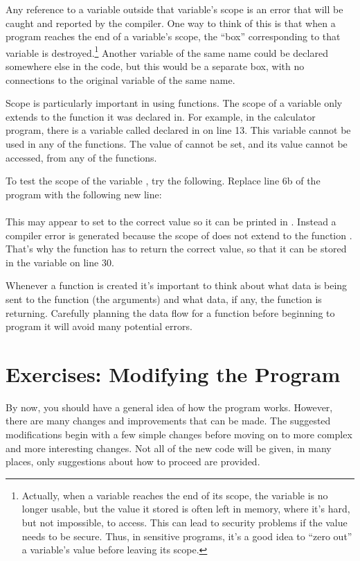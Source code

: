 Any reference to a variable outside that variable's scope is an error that will be caught and reported by the compiler.  One way to think of this is that when a program reaches the end of a variable's scope, the ``box'' corresponding to that variable is destroyed.\footnote{Actually, when a variable reaches the end of its scope, the variable is no longer usable, but the value it stored is often left in memory, where it's hard, but not impossible, to access.  This can lead to security problems if the value needs to be secure.  Thus, in sensitive programs, it's a good idea to ``zero out'' a variable's value before leaving its scope.}  Another variable of the same name could be declared somewhere else in the code, but this would be a separate box, with no connections to the original variable of the same name.

Scope is particularly important in using functions.  The scope of a variable only extends to the function it was declared in.  For example, in the calculator program, there is a variable called  declared in  on line 13.  This variable cannot be used in any of the functions.  The value of  cannot be set, and its value cannot be accessed, from any of the functions.  

To test the scope of the variable , try the following.  Replace line 6b of the program with the following new line:\\
\\
This may appear to set  to the correct value so it can be printed in .  Instead a compiler error is generated because the scope of   does not extend to the function .  That's why the function  has to return the correct value, so that it can be stored in the variable  on line 30.

Whenever a function is created it's important to think about what data is being sent to the function (the arguments) and what data, if any, the function is returning.  Carefully planning the data flow for a function before beginning to program it will avoid many potential errors.

\vspace{+0.25cm}
{\color{\mycolor}\noindent\hrulefill}
\section{Exercises: Modifying the Program}
By now, you should have a general idea of how the program works.  However, there are many changes and improvements that can be made.  The suggested modifications begin with a few simple changes before moving on to more complex and more interesting changes.  Not all of the new code will be given, in many places, only suggestions about how to proceed are provided.


